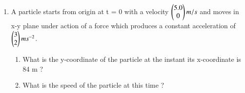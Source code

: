 \begin{enumerate}[label=\arabic*.,ref=\thesubsection.\theenumi]
%
\item  A particle starts from origin at t = 0 with a velocity $\begin{pmatrix}5.0\\0\end{pmatrix} m/s$ and moves in x-y plane under action of a force which produces a constant acceleration of $\begin{pmatrix}3\\2\end{pmatrix}ms^{-2}$.
\begin{enumerate}
\item  What is the
y-coordinate of the particle at the instant its x-coordinate is 84 m ? 
\item  What is the speed of the particle at this time ?
\end{enumerate}

\end{enumerate}
